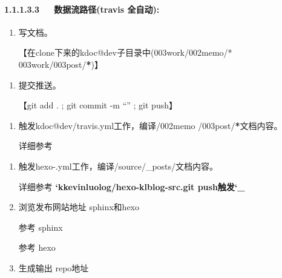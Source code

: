 \documentclass[letterpaper,12pt,english]{sphinxmanual}
\begin{document}
\paragraph{1.1.1.3.3   数据流路径(travis 全自动):}
\label{\detokenize{001software/001install/001._u7f51_u7ad9/gitpage:travis}}\begin{enumerate}
%
\item {} 
写文档。

【在clone下来的kdoc@dev子目录中(003work/002memo/* 003work/003post/{\color{red}\bfseries{}*})】

\end{enumerate}
\begin{enumerate}
%
\setcounter{enumi}{2}
\item {} 
提交推送。

【git add . ; git commit -m “” ; git push】

\end{enumerate}
\begin{enumerate}
%
\setcounter{enumi}{4}
\item {} 
触发kdoc@dev/travis.yml工作，编译/002memo /003post/{\color{red}\bfseries{}*}文档内容。

详细参考  {\hyperref[\detokenize{001software/001install/001._u7f51_u7ad9/gitpage:kevinluolog-kdoc-git-push}]{}}

\end{enumerate}
\begin{enumerate}
%
\setcounter{enumi}{3}
\item {} 
触发hexo-.yml工作，编译/source/\_posts/文档内容。

详细参考  {\color{red}\bfseries{}{}`kkevinluolog/hexo-klblog-src.git push触发{}`\_}

\item {} 
浏览发布网站地址 sphinx和hexo

参考 {\hyperref[\detokenize{001software/001install/001._u7f51_u7ad9/gitpage:kdoc}]{}} sphinx

参考 {\hyperref[\detokenize{001software/001install/001._u7f51_u7ad9/gitpage:hexo-klblog-src}]{}}  hexo

\item {} 
生成输出 repo地址


\end{enumerate}
\end{document}
